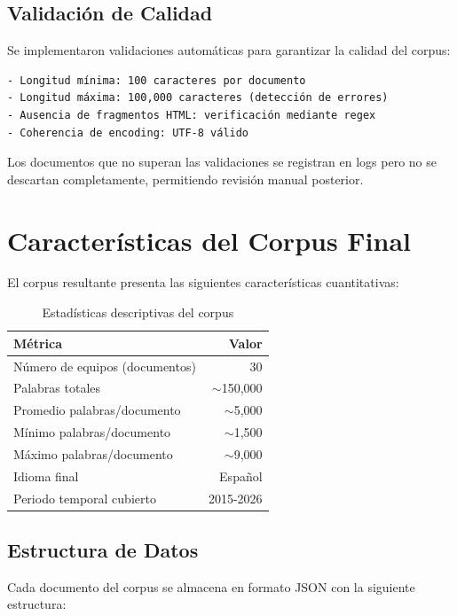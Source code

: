 \subsection{Validación de Calidad}

Se implementaron validaciones automáticas para garantizar la calidad del corpus:

\begin{verbatim}
- Longitud mínima: 100 caracteres por documento
- Longitud máxima: 100,000 caracteres (detección de errores)
- Ausencia de fragmentos HTML: verificación mediante regex
- Coherencia de encoding: UTF-8 válido
\end{verbatim}

Los documentos que no superan las validaciones se registran en logs pero no se descartan completamente, permitiendo revisión manual posterior.

\section{Características del Corpus Final}

El corpus resultante presenta las siguientes características cuantitativas:

\begin{table}[h]
\centering
\begin{tabular}{|l|r|}
\hline
\textbf{Métrica} & \textbf{Valor} \\
\hline
Número de equipos (documentos) & 30 \\
Palabras totales & $\sim$150,000 \\
Promedio palabras/documento & $\sim$5,000 \\
Mínimo palabras/documento & $\sim$1,500 \\
Máximo palabras/documento & $\sim$9,000 \\
Idioma final & Español \\
Periodo temporal cubierto & 2015-2026 \\
\hline
\end{tabular}
\caption{Estadísticas descriptivas del corpus}
\label{tab:corpus_stats}
\end{table}

\subsection{Estructura de Datos}

Cada documento del corpus se almacena en formato JSON con la siguiente estructura:

